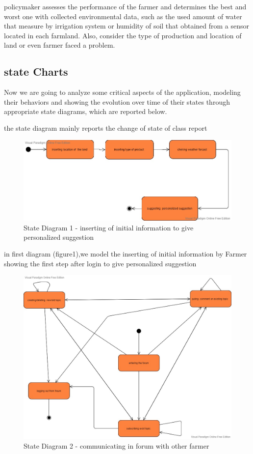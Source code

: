 policymaker assesses the performance of the farmer and determines the best and worst one with collected environmental data, such as the used amount of water that measure by irrigation system or humidity of soil that obtained from a sensor located in each farmland. Also, consider the type of production and location of land or even farmer faced a problem.\newline

\pagebreak
\subsection{state Charts}
Now we are going to analyze some critical aspects of the application, modeling their behaviors and showing the evolution over time of their states through appropriate state diagrams, which are reported below.
\newline

 \hspace{3cm} \footnotesize{ the state diagram mainly reports the change of state of class report }
 \begin{figure}[H]
\includegraphics[width=1\textwidth]{figures/firstStateDiagram.jpg}
\caption{\label{fig:student } State Diagram 1 - inserting  of initial information to give personalized suggestion }
\end{figure}
in first diagram (figure1),we model the inserting of initial information by Farmer  showing the first step after login to give personalized suggestion 


 \begin{figure}[H]
\includegraphics[width=1\textwidth]{figures/SecondStateDiagram.jpg}
\caption{\label{fig:student } State Diagram 2 - communicating in forum with other farmer }
\end{figure}

